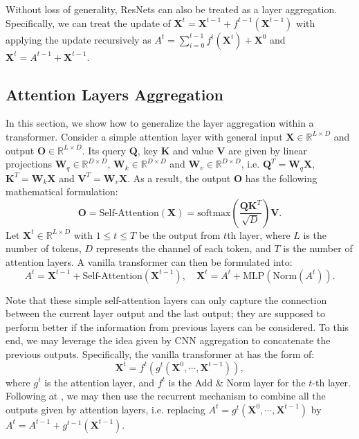 Without loss of generality, ResNets \citep{he2016deep,he2016identity} can also be treated as a layer aggregation. Specifically, we can treat the update of $\boldsymbol{X}^t = \boldsymbol{X}^{t-1} + f^{t-1}(\boldsymbol{X}^{t-1})$ with applying the update recursively as $A^t = \sum_{i=0}^{t-1} f^i(\boldsymbol{X}^i) + \boldsymbol{X}^0$ and $\boldsymbol{X}^t = A^{t-1}+\boldsymbol{X}^{t-1}$.


\subsection{Attention Layers Aggregation}
In this section, we show how to generalize the layer aggregation within a transformer. Consider a simple attention layer with general input $\mathbf{X} \in \mathbb{R}^{L \times D}$ and output $\mathbf{O} \in \mathbb{R}^{L \times D}$.
Its query $\mathbf{Q}$, key $\mathbf{K}$ and value $\mathbf{V}$ are given by linear projections $\boldsymbol{W}_q \in \mathbb{R}^{D \times D}$, $\boldsymbol{W}_k \in \mathbb{R}^{D \times D}$ and $\boldsymbol{W}_v \in \mathbb{R}^{D \times D}$, i.e. $\mathbf{Q}^T = \boldsymbol{W}_q \mathbf{X}$, $\mathbf{K}^T = \boldsymbol{W}_k \mathbf{X}$ and $\mathbf{V}^T = \boldsymbol{W}_v \mathbf{X}$. As a result, the output $\mathbf{O}$ has the following mathematical formulation:
\begin{equation}
\mathbf{O} = \text{Self-Attention}(\boldsymbol{X}) = \text{softmax}(\frac{\mathbf{Q}\mathbf{K}^T}{\sqrt{D}})\mathbf{V}.
\end{equation}
Let $\boldsymbol{X}^t \in \mathbb{R}^{L \times D}$ with $1 \leq t \leq T$ be the output from $t$th layer, where $L$ is the number of tokens, $D$ represents the channel of each token, and $T$ is the number of attention layers. 
A vanilla transformer can then be formulated into:
\begin{equation}
    \label{eq:vanillatransformer}
        A^{t} =\boldsymbol{X}^{t-1}+\text{Self-Attention}(\boldsymbol{X}^{t-1}), \quad
        \boldsymbol{X}^{t} = A^{t} + \text{MLP}(\text{Norm}(A^{t})).
\end{equation}

Note that these simple self-attention layers can only capture the connection between the current layer output and the last output; they are supposed to perform better if the information from previous layers can be considered. To this end, we may leverage the idea given by CNN aggregation to concatenate the previous outputs. Specifically, the vanilla transformer at  has the form of:
\begin{equation}
    \label{eq:vanillatransformerre}
    \boldsymbol{X}^t=f^t(g^t(\boldsymbol{X}^0,\cdots,\boldsymbol{X}^{t-1})),
\end{equation}
where $g^t$ is the attention layer, and $f^t$ is the Add \& Norm layer for the $t$-th layer. 
Following \citet{zhao2021recurrence} at , we may then use the recurrent mechanism to combine all the outputs given by attention layers, i.e. replacing $A^{t} = g^t(\boldsymbol{X}^0,\cdots,\boldsymbol{X}^{t-1})$ by $A^{t} = A^{t-1} + g^{t-1}(\boldsymbol{X}^{t-1})$.